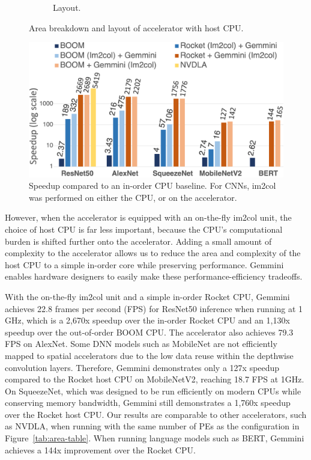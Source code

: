 \begin{figure}[t]
\begin{subfigure}[b]{0.4\linewidth}
\caption{Layout.}
\label{fig:area-layout}
\end{subfigure}
\caption{Area breakdown and layout of accelerator with host CPU.}
\label{fig:evaluation}
\vspace{-0.2in}
\end{figure}

\begin{figure}[b]
\centering
\includegraphics[width=\linewidth]{fig/perf-conv-new.png}
\caption{Speedup compared to an in-order CPU baseline. For CNNs, im2col was performed on either the CPU, or on the accelerator.}
\label{fig:perf-dnn}
\end{figure}

However, when the accelerator is equipped with an on-the-fly im2col unit, the choice of host CPU is far less important, because the CPU's computational burden is shifted further onto the accelerator. Adding a small amount of complexity to the accelerator allows us to reduce the area and complexity of the host CPU to a simple in-order core while preserving performance. Gemmini enables hardware designers to easily make these performance-efficiency tradeoffs.

With the on-the-fly im2col unit and a simple in-order Rocket CPU, Gemmini achieves 22.8 frames per second (FPS) for ResNet50 inference when running at 1 GHz, which is a 2,670x speedup over the in-order Rocket CPU and an 1,130x speedup over the out-of-order BOOM CPU. The accelerator also achieves 79.3 FPS on AlexNet. Some DNN models such as MobileNet are not efficiently mapped to spatial accelerators due to the low data reuse within the depthwise convolution layers. Therefore, Gemmini demonstrates only a 127x speedup compared to the Rocket host CPU on MobileNetV2, reaching 18.7 FPS at 1GHz.  On SqueezeNet, which was designed to be run efficiently on modern CPUs while conserving memory bandwidth, Gemmini still demonstrates a 1,760x speedup over the Rocket host CPU. Our results are comparable to other accelerators, such as NVDLA, when running with the same number of PEs as the configuration in Figure~\ref{tab:area-table}. When running language models such as BERT, Gemmini achieves a 144x improvement over the Rocket CPU.

